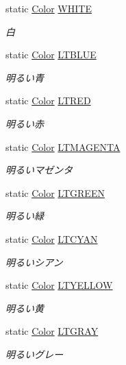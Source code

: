 \begin{DoxyCompactItemize}
static \hyperlink{struct_color}{Color} \hyperlink{struct_color_aafb827ace5780d74f0c513ce92077853}{W\-H\-I\-T\-E}
\begin{DoxyCompactList}\small\item\em 白 \end{DoxyCompactList}\item 
static \hyperlink{struct_color}{Color} \hyperlink{struct_color_a5092bf1d5751684dbe61f526595e67cb}{L\-T\-B\-L\-U\-E}
\begin{DoxyCompactList}\small\item\em 明るい青 \end{DoxyCompactList}\item 
static \hyperlink{struct_color}{Color} \hyperlink{struct_color_a5b50d75c7668ab6eb5a2fac673748b22}{L\-T\-R\-E\-D}
\begin{DoxyCompactList}\small\item\em 明るい赤 \end{DoxyCompactList}\item 
static \hyperlink{struct_color}{Color} \hyperlink{struct_color_a2bd114820dbf7b29558679072fedefa0}{L\-T\-M\-A\-G\-E\-N\-T\-A}
\begin{DoxyCompactList}\small\item\em 明るいマゼンタ \end{DoxyCompactList}\item 
static \hyperlink{struct_color}{Color} \hyperlink{struct_color_a13dd4f077a964b82196f85bf262dff57}{L\-T\-G\-R\-E\-E\-N}
\begin{DoxyCompactList}\small\item\em 明るい緑 \end{DoxyCompactList}\item 
static \hyperlink{struct_color}{Color} \hyperlink{struct_color_ac4b33f94628254120531de78a7b0924c}{L\-T\-C\-Y\-A\-N}
\begin{DoxyCompactList}\small\item\em 明るいシアン \end{DoxyCompactList}\item 
static \hyperlink{struct_color}{Color} \hyperlink{struct_color_a6f028404afe08f3e13309376541b0587}{L\-T\-Y\-E\-L\-L\-O\-W}
\begin{DoxyCompactList}\small\item\em 明るい黄 \end{DoxyCompactList}\item 
static \hyperlink{struct_color}{Color} \hyperlink{struct_color_a02d0fce1510a32cd80cc1ff59d500d6a}{L\-T\-G\-R\-A\-Y}
\begin{DoxyCompactList}\small\item\em 明るいグレー \end{DoxyCompactList}\item 

\end{DoxyCompactItemize}
